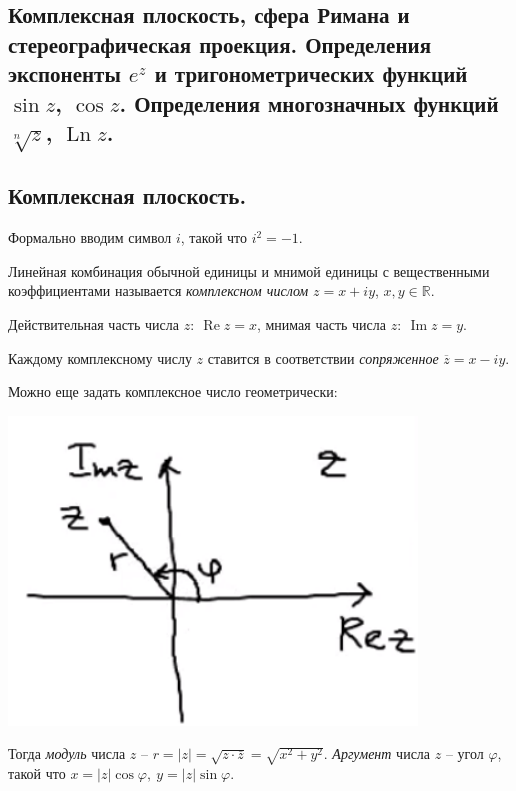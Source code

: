 \subsection{Комплексная плоскость, сфера Римана и стереографическая проекция. Определения экспоненты $e^z$ и тригонометрических функций $\sin z$, $\cos z$. Определения многозначных функций $\sqrt[n]{z}$, $\operatorname{Ln} z$.}

\subsection*{Комплексная плоскость.}
 
 Формально вводим символ $i$, такой что $i^2 = -1$.
 
 \begin{definition*} Линейная комбинация обычной единицы и мнимой единицы с вещественными коэффициентами называется \textit{комплексном числом} $z = x + iy$, $x, y \in \mathbb{R}$.  
 	
 Действительная часть числа $z:\ \operatorname{Re} z = x$, мнимая часть числа $z:\ \operatorname{Im} z = y$.
 \end{definition*}
 
 \begin{definition*}
 Каждому комплексному числу $z$ ставится в соответствии \textit{сопряженное}  $\overline{z} = x - iy$.
\end{definition*}
 Можно еще задать комплексное число геометрически:
 
 \includegraphics[scale=0.5]{img/1.png}
 
 \begin{definition*}
 Тогда \textit{модуль} числа $z$ -- $r = |z| = \sqrt{z \cdot \overline{z}} = \sqrt{x^2 + y^2}$.
  \textit{Аргумент} числа $z$ -- угол $\varphi$, такой что $x = |z| \cos \varphi,\ y = |z| \sin \varphi$. \end{definition*}
  
